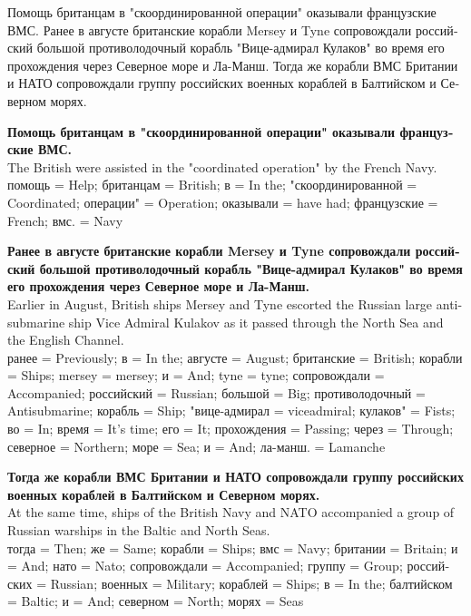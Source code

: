 

\setmainlanguage{russian}



\begin{russian}
Помощь британцам в "скоординированной операции" оказывали французские ВМС. Ранее в августе британские корабли Mersey и Tyne сопровождали российский большой противолодочный корабль "Вице-адмирал Кулаков" во время его прохождения через Северное море и Ла-Манш. Тогда же корабли ВМС Британии и НАТО сопровождали группу российских военных кораблей в Балтийском и Северном морях.
\end{russian}

{\bf Помощь британцам в "скоординированной операции" оказывали французские ВМС. }\\
The British were assisted in the "coordinated operation" by the French Navy. \\
{\color{darkgreen} помощь = Help; британцам = British; в = In the; "скоординированной = Coordinated; операции" = Operation; оказывали = have had; французские = French; вмс. = Navy}

{\bf Ранее в августе британские корабли Mersey и Tyne сопровождали российский большой противолодочный корабль "Вице-адмирал Кулаков" во время его прохождения через Северное море и Ла-Манш. }\\
Earlier in August, British ships Mersey and Tyne escorted the Russian large anti-submarine ship Vice Admiral Kulakov as it passed through the North Sea and the English Channel. \\
{\color{darkgreen} ранее = Previously; в = In the; августе = August; британские = British; корабли = Ships; mersey = mersey; и = And; tyne = tyne; сопровождали = Accompanied; российский = Russian; большой = Big; противолодочный = Antisubmarine; корабль = Ship; "вице-адмирал = viceadmiral; кулаков" = Fists; во = In; время = It's time; его = It; прохождения = Passing; через = Through; северное = Northern; море = Sea; и = And; ла-манш. = Lamanche}

{\bf Тогда же корабли ВМС Британии и НАТО сопровождали группу российских военных кораблей в Балтийском и Северном морях.}\\
At the same time, ships of the British Navy and NATO accompanied a group of Russian warships in the Baltic and North Seas.\\
{\color{darkgreen} тогда = Then; же = Same; корабли = Ships; вмс = Navy; британии = Britain; и = And; нато = Nato; сопровождали = Accompanied; группу = Group; российских = Russian; военных = Military; кораблей = Ships; в = In the; балтийском = Baltic; и = And; северном = North; морях = Seas}

